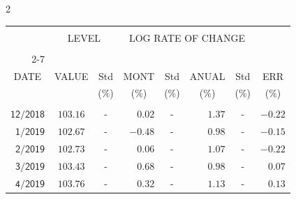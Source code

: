 \begin{multicols}{2}{ 
\begin{tabular}{rccrcrcr} 
\hline 
 \multicolumn{1}{|c|}{}  &  \multicolumn{2}{c|}{} & 
\multicolumn{4}{c}{} & \multicolumn{1}{|c|}{}\vspace{-.10in}\\ 
\multicolumn{1}{|c|}{}  &  \multicolumn{2}{c|}{LEVEL} & 
\multicolumn{4}{c}{LOG RATE OF CHANGE} & \multicolumn{1}{|c|}{}    \\  
\multicolumn{1}{|c|}{}  &  \multicolumn{2}{c|}{} & 
\multicolumn{4}{c}{} & \multicolumn{1}{|c|}{}\vspace{-.10in}\\ \cline{2-7} 
\multicolumn{1}{|c|}{ } &\multicolumn{1}{c|}{ } & \multicolumn{1}{c|}{} & \multicolumn{1}{c|}{} & \multicolumn{1}{c|}{}     & \multicolumn{1}{c|}{} & \multicolumn{1}{c|}{}  & \multicolumn{1}{c|}{}  \vspace{-.05in}\\  
\multicolumn{1}{|c|}{DATE } &\multicolumn{1}{c|}{ VALUE} & \multicolumn{1}{c|}{Std} & \multicolumn{1}{c|}{MONT} & \multicolumn{1}{c|}{Std}     & \multicolumn{1}{c|}{ANUAL} & \multicolumn{1}{c|}{Std}  & \multicolumn{1}{c|}{ERR}\\  
\multicolumn{1}{|c|}{ }      & \multicolumn{1}{c|}{  }    & \multicolumn{1}{c|}{($\%$)}&  \multicolumn{1}{c|}{($\%$)  }  & \multicolumn{1}{c|}{($\%$)} & \multicolumn{1}{c|}{($\%$) }     & \multicolumn{1}{c|}{ ($\%$) }  &  \multicolumn{1}{c|}{ ($\%$) } \\  
 \hline 
 \\$\mathsf{      12/2018}$ &$\mathsf{   103.16}$ &     - &$\mathsf{    0.02}$ &     - &$\mathsf{     1.37 }$ &     - &$\mathsf{  -0.22} $ \vspace{-.005in}\\ 
$\mathsf{       1/2019}$ &$\mathsf{   102.67}$ &     - &$\mathsf{   -0.48}$ &     - &$\mathsf{     0.98 }$ &     - &$\mathsf{  -0.15} $ \vspace{-.005in}\\ 
$\mathsf{       2/2019}$ &$\mathsf{   102.73}$ &     - &$\mathsf{    0.06}$ &     - &$\mathsf{     1.07 }$ &     - &$\mathsf{  -0.22} $ \vspace{-.005in}\\ 
$\mathsf{       3/2019}$ &$\mathsf{   103.43}$ &     - &$\mathsf{    0.68}$ &     - &$\mathsf{     0.98 }$ &     - &$\mathsf{   0.07} $ \vspace{-.005in}\\ 
$\mathsf{       4/2019}$ &$\mathsf{   103.76}$ &     - &$\mathsf{    0.32}$ &     - &$\mathsf{     1.13 }$ &     - &$\mathsf{   0.13} $ \vspace{-.005in}\\ 

\end{tabular}}
\end{multicols}
